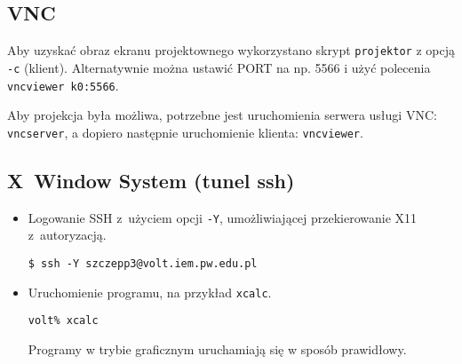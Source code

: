 \documentclass[a4paper,11pt]{article}
\begin{document}
\subsection{VNC}


Aby uzyskać obraz ekranu projektownego wykorzystano skrypt \verb|projektor| z opcją \verb|-c| (klient). 
Alternatywnie można ustawić PORT na np. 5566 i użyć polecenia \verb|vncviewer k0:5566|.

Aby projekcja była możliwa, potrzebne jest uruchomienia serwera usługi VNC: \verb|vncserver|, a dopiero następnie
uruchomienie klienta: \verb|vncviewer|.

\subsection{X~Window System (tunel ssh)}

\begin{itemize}

\item Logowanie SSH z~użyciem opcji \verb|-Y|, umożliwiającej przekierowanie X11
    z~autoryzacją.

\begin{verbatim}
$ ssh -Y szczepp3@volt.iem.pw.edu.pl
\end{verbatim}

\item Uruchomienie programu, na przykład \verb|xcalc|.

\begin{verbatim}
volt% xcalc
\end{verbatim}

Programy w trybie graficznym uruchamiają się w sposób prawidłowy.

\end{itemize}
\end{document}
